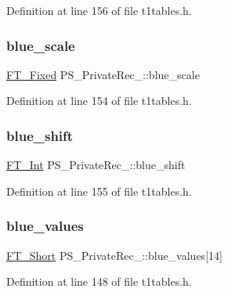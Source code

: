 Definition at line 156 of file t1tables.\+h.

\mbox{\label{struct_p_s___private_rec___aef435ab2e5ad52aa4e2ad3eed14b6666}} 
\subsubsection{\texorpdfstring{blue\_scale}{blue\_scale}}
{\footnotesize\ttfamily \mbox{\hyperlink{fttypes_8h_a5f5a679cc09f758efdd0d1c5feed3c3d}{F\+T\+\_\+\+Fixed}} P\+S\+\_\+\+Private\+Rec\+\_\+\+::blue\+\_\+scale}



Definition at line 154 of file t1tables.\+h.

\mbox{\label{struct_p_s___private_rec___aaf1a9f747580eb6618422e3c5b77ae82}} 
\subsubsection{\texorpdfstring{blue\_shift}{blue\_shift}}
{\footnotesize\ttfamily \mbox{\hyperlink{fttypes_8h_af90e5fb0d07e21be9fe6faa33f02484c}{F\+T\+\_\+\+Int}} P\+S\+\_\+\+Private\+Rec\+\_\+\+::blue\+\_\+shift}



Definition at line 155 of file t1tables.\+h.

\mbox{\label{struct_p_s___private_rec___ae2c23ed06e54b680473f924483685425}} 
\subsubsection{\texorpdfstring{blue\_values}{blue\_values}}
{\footnotesize\ttfamily \mbox{\hyperlink{fttypes_8h_aa7279be89046a2563cd3d4d6651fbdcf}{F\+T\+\_\+\+Short}} P\+S\+\_\+\+Private\+Rec\+\_\+\+::blue\+\_\+values\mbox{[}14\mbox{]}}



Definition at line 148 of file t1tables.\+h.

